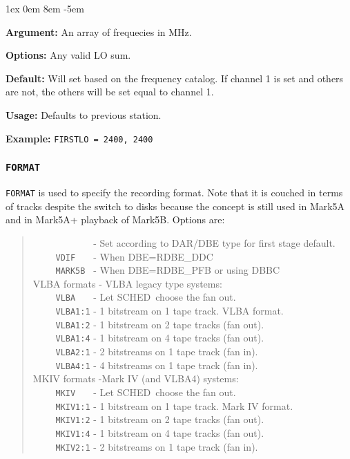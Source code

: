 \documentclass{report}
\newcommand{\schedb}{{\sc SCHED~}}
\newcommand{\rcwbox}[5]{
  \begin{list}{}{\parsep 1ex  \itemsep 0em
                 \leftmargin 8em  \itemindent -5em }
    \item {\bf Argument:} #1
    \item {\bf Options:}  #2
    \item {\bf Default:}  #3
    \item {\bf Usage:}    #4
    \item {\bf Example:}  #5
  \end{list}
}
\begin{document}
\rcwbox
{An array of frequecies in MHz.}
{Any valid LO sum.}
{Will set based on the frequency catalog.  If channel 1 is set and
others are not, the others will be set equal to channel 1.}
{Defaults to previous station.}
{{\tt FIRSTLO = 2400, 2400}}


\subsubsection{\label{SP:FORMAT}{\tt FORMAT}}

{\tt FORMAT} is used to specify the recording format. Note that it is couched
in terms of tracks despite the switch to disks because the concept is still
used in Mark5A and in Mark5A+ playback of Mark5B.  Options are:
\begin{verse}

\noindent ~~~~ {\tt ~~~~~~~} - Set according to DAR/DBE type for first 
stage default.\\
\noindent ~~~~ {\tt VDIF~~~} - When DBE=RDBE\_DDC  \\
\noindent ~~~~ {\tt MARK5B~} - When DBE=RDBE\_PFB or using DBBC  \\
\noindent VLBA formats - VLBA legacy type systems:  \\
\noindent ~~~~ {\tt VLBA~~~} - Let \schedb choose the fan out. \\
\noindent ~~~~ {\tt VLBA1:1} - 1 bitstream on 1 tape track. VLBA format.  \\
\noindent ~~~~ {\tt VLBA1:2} - 1 bitstream on 2 tape tracks (fan out).    \\
\noindent ~~~~ {\tt VLBA1:4} - 1 bitstream on 4 tape tracks (fan out).    \\
\noindent ~~~~ {\tt VLBA2:1} - 2 bitstreams on 1 tape track (fan in).     \\
\noindent ~~~~ {\tt VLBA4:1} - 4 bitstreams on 1 tape track (fan in).     \\
\noindent MKIV formats -Mark IV (and VLBA4) systems:  \\
\noindent ~~~~ {\tt MKIV~~~} - Let \schedb choose the fan out. \\
\noindent ~~~~ {\tt MKIV1:1} - 1 bitstream on 1 tape track. Mark IV format.  \\
\noindent ~~~~ {\tt MKIV1:2} - 1 bitstream on 2 tape tracks (fan out).    \\
\noindent ~~~~ {\tt MKIV1:4} - 1 bitstream on 4 tape tracks (fan out).    \\
\noindent ~~~~ {\tt MKIV2:1} - 2 bitstreams on 1 tape track (fan in).     \\

\end{verse}
\end{document}
